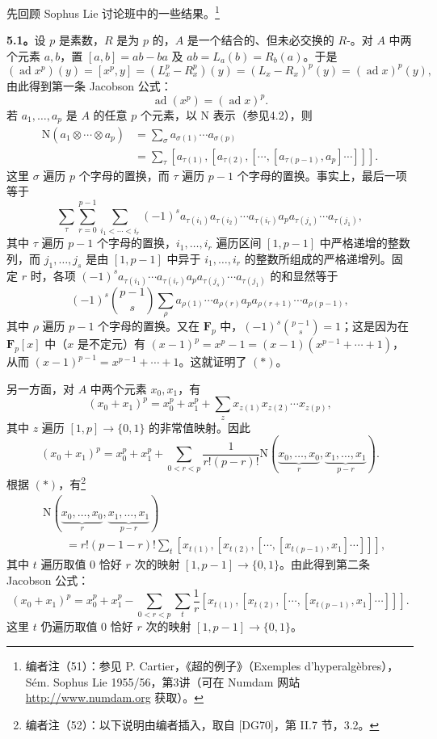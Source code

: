先回顾 Sophus Lie 讨论班中的一些结果。\footnote{编者注（51）：参见 P. Cartier，《超的例子》（Exemples d’hyperalgèbres），Sém. Sophus Lie 1955/56，第3讲（可在 Numdam 网站 \url{http://www.numdam.org} 获取）。}

\textbf{5.1。}设 $p$ 是素数，$R$ 是为 $p$ 的，$A$ 是一个结合的、但未必交换的 $R$-。对 $A$ 中两个元素 $a,b$，置 $[a,b]=ab-ba$ 及 $ab=L_a(b)=R_b(a)$。于是
\[
 (\operatorname{ad}x^p)(y)=[x^p,y]=(L_x^p-R_x^p)(y)
 =(L_x-R_x)^p(y)=(\operatorname{ad}x)^p(y),
\]
由此得到第一条 Jacobson 公式：
\[
 \operatorname{ad}(x^p)=(\operatorname{ad}x)^p.\tag{i}
\]
若 $a_1,\ldots,a_p$ 是 $A$ 的任意 $p$ 个元素，以 $\mathrm N$ 表示（参见4.2），则
\[
\begin{split}
 \mathrm N(a_1\otimes\cdots\otimes a_p)
 &=\sum_\sigma a_{\sigma(1)}\cdots a_{\sigma(p)}\\
 &=\sum_\tau[a_{\tau(1)},[a_{\tau(2)},[\cdots,[a_{\tau(p-1)},a_p]\cdots]]].
\end{split}\tag{*}
\]
这里 $\sigma$ 遍历 $p$ 个字母的置换，而 $\tau$ 遍历 $p-1$ 个字母的置换。事实上，最后一项等于
\[
 \sum_\tau\sum_{r=0}^{p-1}\sum_{i_1<\cdots<i_r}
 (-1)^s a_{\tau(i_1)}a_{\tau(i_2)}\cdots a_{\tau(i_r)}a_p
 a_{\tau(j_s)}\cdots a_{\tau(j_1)},
\]
其中 $\tau$ 遍历 $p-1$ 个字母的置换，$i_1,\ldots,i_r$ 遍历区间 $[1,p-1]$ 中严格递增的整数列，而 $j_1,\ldots,j_s$ 是由 $[1,p-1]$ 中异于 $i_1,\ldots,i_r$ 的整数所组成的严格递增列。固定 $r$ 时，各项
$(-1)^s a_{\tau(i_1)}\cdots a_{\tau(i_r)}a_p a_{\tau(j_s)}\cdots a_{\tau(j_1)}$
的和显然等于
\[
 (-1)^s\binom{p-1}{s}\sum_\rho
 a_{\rho(1)}\cdots a_{\rho(r)}a_p a_{\rho(r+1)}\cdots a_{\rho(p-1)},
\]
其中 $\rho$ 遍历 $p-1$ 个字母的置换。又在 $\mathbf F_p$ 中，$(-1)^s\binom{p-1}{s}=1$；这是因为在 $\mathbf F_p[x]$ 中（$x$ 是不定元）有
$(x-1)^p=x^p-1=(x-1)(x^{p-1}+\cdots+1)$，从而
$(x-1)^{p-1}=x^{p-1}+\cdots+1$。这就证明了 $(*)$。

另一方面，对 $A$ 中两个元素 $x_0,x_1$，有
\[
 (x_0+x_1)^p=x_0^p+x_1^p+\sum_z x_{z(1)}x_{z(2)}\cdots x_{z(p)},
\]
其中 $z$ 遍历 $[1,p]\to\{0,1\}$ 的非常值映射。因此
\[
 (x_0+x_1)^p=x_0^p+x_1^p+
 \sum_{0<r<p}\frac{1}{r!(p-r)!}
 \mathrm N(\underbrace{x_0,\ldots,x_0}_{r},\underbrace{x_1,\ldots,x_1}_{p-r}).
\]
根据 $(*)$，有\footnote{编者注（52）：以下说明由编者插入，取自 [DG70]，第 II.7 节，3.2。}
\[
\begin{split}
 &\mathrm N(\underbrace{x_0,\ldots,x_0}_{r},\underbrace{x_1,\ldots,x_1}_{p-r})\\
 &\qquad=r!(p-1-r)!\sum_t
 [x_{t(1)},[x_{t(2)},[\cdots,[x_{t(p-1)},x_1]\cdots]]],
\end{split}
\]
其中 $t$ 遍历取值 $0$ 恰好 $r$ 次的映射 $[1,p-1]\to\{0,1\}$。由此得到第二条 Jacobson 公式：
\[
 (x_0+x_1)^p=x_0^p+x_1^p-
 \sum_{0<r<p}\sum_t\frac1r
 [x_{t(1)},[x_{t(2)},[\cdots,[x_{t(p-1)},x_1]\cdots]]].\tag{ii}
\]
这里 $t$ 仍遍历取值 $0$ 恰好 $r$ 次的映射 $[1,p-1]\to\{0,1\}$。


